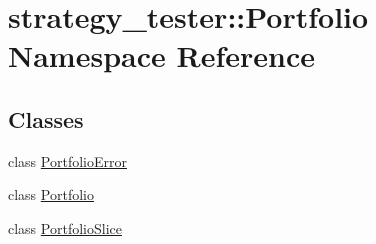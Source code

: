 \hypertarget{namespacestrategy__tester_1_1Portfolio}{\section{strategy\-\_\-tester\-:\-:\-Portfolio \-Namespace \-Reference}
\label{namespacestrategy__tester_1_1Portfolio}
}
\subsection*{\-Classes}
\begin{DoxyCompactItemize}
\item 
class \hyperlink{classstrategy__tester_1_1Portfolio_1_1PortfolioError}{\-Portfolio\-Error}
\item 
class \hyperlink{classstrategy__tester_1_1Portfolio_1_1Portfolio}{\-Portfolio}
\item 
class \hyperlink{classstrategy__tester_1_1Portfolio_1_1PortfolioSlice}{\-Portfolio\-Slice}
\end{DoxyCompactItemize}
